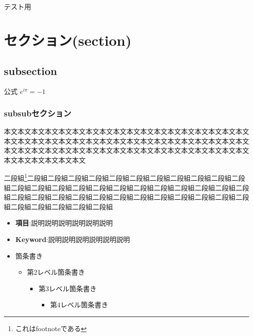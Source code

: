 テスト用

\hypertarget{ux30bbux30afux30b7ux30e7ux30f3section}{%
\section{セクション(section)}\label{ux30bbux30afux30b7ux30e7ux30f3section}}

\hypertarget{subsection}{%
\subsection{subsection}\label{subsection}}

\begin{itembox}[l]{公式}
$e^{i \pi} = -1$
\end{itembox}

\hypertarget{subsubux30bbux30afux30b7ux30e7ux30f3}{%
\subsubsection{subsubセクション}\label{subsubux30bbux30afux30b7ux30e7ux30f3}}

本文本文本文本文本文本文本文本文本文本文本文本文本文本文本文本文本文本文本文本文本文本文本文本文本文本文本文本文本文本文本文本文本文本文本文本文本文本文本文本文本文本文本文本文本文本文本文本文本文本文本文本文本文本文本文本文本文本文本文本文

\begin{multicols}{2}
二段組\footnote{これはfootnoteである}二段組二段組二段組二段組二段組二段組二段組二段組二段組二段組二段組二段組二段組二段組二段組二段組二段組二段組二段組二段組二段組二段組二段組二段組二段組二段組二段組二段組二段組二段組二段組二段組二段組二段組二段組二段組二段組二段組二段組二段組
\end{multicols}

\begin{itemize}
\item
  \textbf{項目}:説明説明説明説明説明説明
\item
  \textbf{Keyword}:説明説明説明説明説明説明
\item
  箇条書き

  \begin{itemize}
  \tightlist
  \item
    第2レベル箇条書き

    \begin{itemize}
    \tightlist
    \item
      第3レベル箇条書き

      \begin{itemize}
      \tightlist
      \item
        第4レベル箇条書き
      \end{itemize}
    \end{itemize}
  \end{itemize}
\end{itemize}

